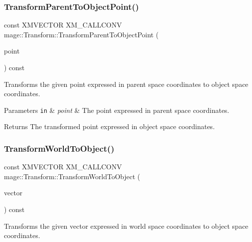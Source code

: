 \subsubsection{\texorpdfstring{Transform\+Parent\+To\+Object\+Point()}{TransformParentToObjectPoint()}}
{\footnotesize\ttfamily const X\+M\+V\+E\+C\+T\+OR X\+M\+\_\+\+C\+A\+L\+L\+C\+O\+NV mage\+::\+Transform\+::\+Transform\+Parent\+To\+Object\+Point (\begin{DoxyParamCaption}\item[{F\+X\+M\+V\+E\+C\+T\+OR}]{point }\end{DoxyParamCaption}) const\hspace{0.3cm}{\ttfamily [noexcept]}}

Transforms the given point expressed in parent space coordinates to object space coordinates.


\begin{DoxyParams}[1]{Parameters}
\mbox{\tt in}  & {\em point} & The point expressed in parent space coordinates. \\
\hline
\end{DoxyParams}
\begin{DoxyReturn}{Returns}
The transformed point expressed in object space coordinates. 
\end{DoxyReturn}
\mbox{\label{classmage_1_1_transform_adc0ce8b6fa55d289b5354d21b3e96486}} 
\subsubsection{\texorpdfstring{Transform\+World\+To\+Object()}{TransformWorldToObject()}}
{\footnotesize\ttfamily const X\+M\+V\+E\+C\+T\+OR X\+M\+\_\+\+C\+A\+L\+L\+C\+O\+NV mage\+::\+Transform\+::\+Transform\+World\+To\+Object (\begin{DoxyParamCaption}\item[{F\+X\+M\+V\+E\+C\+T\+OR}]{vector }\end{DoxyParamCaption}) const\hspace{0.3cm}{\ttfamily [noexcept]}}

Transforms the given vector expressed in world space coordinates to object space coordinates.


